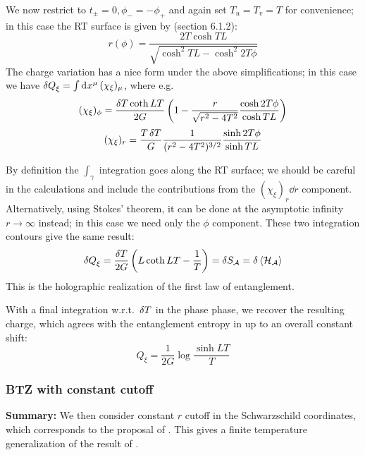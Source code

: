 \documentclass[11pt,a4paper,utf8]{article}
\begin{document}
	We now restrict to $t_\pm = 0, \phi_- = -\phi_+$ and again set $T_u = T_v = T$ for convenience; in this case the RT surface is given by \textcite{Rangamani:2016dms} (section 6.1.2):
	\begin{equation}
		r(\phi) = \frac{2T\cosh TL}{
				\sqrt{\cosh^2 TL - \cosh^2 2T\phi}
			}
	\end{equation}
	The charge variation has a nice form under the above simplifications; in this case we have $
		\mathinner{\delta Q}_{\xi}
		= \int \mathinner{\mathrm{d}^{}x^\mu} (\chi_\xi)_\mu
	$, where e.g.
	\begin{equation}
		(\chi_\xi)_\phi
		= \frac{\mathinner{\delta T} \coth LT}{2G}
			\left(
				1 - {\frac{r}{\sqrt{r^2 - 4T^2}}}
				\frac{\cosh 2T\phi}{\cosh TL}
			\right)
	\end{equation}
	\begin{equation}
		(\chi_\xi)_r
		= \frac{T\mathinner{\delta T}}{G}
			\frac{1}{(r^2 - 4T^2)^{3/2}}
			\frac{\sinh 2T\phi}{\sinh TL}
	\end{equation}
	
	By definition the $\int_\gamma$ integration goes along the RT surface; we should be careful in the calculations and include the contributions from the $(\chi_\xi)_r \dd{r}$ component. 
	Alternatively, using Stokes' theorem, it can be done at the asymptotic infinity $r\to\infty$ instead; in this case we need only the $\phi$ component. These two integration contours give the same result:
	\begin{equation}
		\mathinner{\delta Q}_\xi
		= \frac{\mathinner{\delta T}}{2G} \left(
				L \coth LT - \frac{1}{T}
			\right)
		= \mathinner{\delta S_{\mathcal{A}}}
		= \mathinner{\delta \left\langle\mathcal{H}_{\mathcal{A}}\right\rangle}
	\end{equation}
	This is the holographic realization of the first law of entanglement. 
	
	
	With a final integration w.r.t.~$\mathinner{\delta T}$ in the phase phase, we recover the resulting charge, which agrees with the entanglement entropy in \cite{Rangamani:2016dms} up to an overall constant shift:
	\begin{equation}
		Q_\xi = \frac{1}{2G} \log \frac{\sinh LT}{T}
	\end{equation}
	
\pagebreak
\subsubsection{BTZ with constant cutoff}
\textbf{Summary:} We then consider constant $r$ cutoff in the Schwarzschild coordinates, which corresponds to the proposal of \cite{McGough:2016lol}. This gives a finite temperature generalization of the result of \cite{Lewkowycz:2019xse}. 
\end{document}
